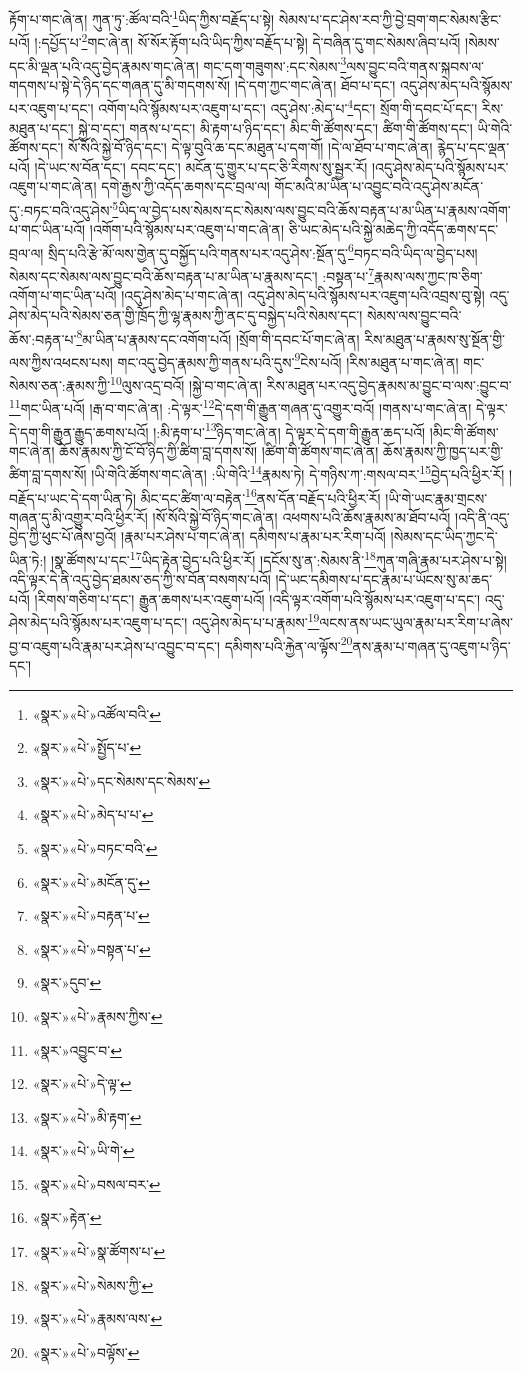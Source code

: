 རྟོག་པ་གང་ཞེ་ན། ཀུན་ཏུ་:ཚོལ་བའི་\footnote{«སྣར་»«པེ་»འཚོལ་བའི་}ཡིད་ཀྱིས་བརྗོད་པ་སྟེ། སེམས་པ་དང་ཤེས་རབ་ཀྱི་བྱེ་བྲག་གང་སེམས་རྩིང་པའོ། །:དཔྱོད་པ་\footnote{«སྣར་»«པེ་»སྤྱོད་པ་}གང་ཞེ་ན། སོ་སོར་རྟོག་པའི་ཡིད་ཀྱིས་བརྗོད་པ་སྟེ། དེ་བཞིན་དུ་གང་སེམས་ཞིབ་པའོ། །སེམས་དང་མི་ལྡན་པའི་འདུ་བྱེད་རྣམས་གང་ཞེ་ན། གང་དག་གཟུགས་:དང་སེམས་\footnote{«སྣར་»«པེ་»དང་སེམས་དང་སེམས་}ལས་བྱུང་བའི་གནས་སྐབས་ལ་གདགས་པ་སྟེ་དེ་ཉིད་དང་གཞན་དུ་མི་གདགས་སོ། །དེ་དག་ཀྱང་གང་ཞེ་ན། ཐོབ་པ་དང་། འདུ་ཤེས་མེད་པའི་སྙོམས་པར་འཇུག་པ་དང་། འགོག་པའི་སྙོམས་པར་འཇུག་པ་དང་། འདུ་ཤེས་:མེད་པ་\footnote{«སྣར་»«པེ་»མེད་པ་པ་}དང་། སྲོག་གི་དབང་པོ་དང་། རིས་མཐུན་པ་དང་། སྐྱེ་བ་དང་། གནས་པ་དང་། མི་རྟག་པ་ཉིད་དང་། མིང་གི་ཚོགས་དང་། ཚིག་གི་ཚོགས་དང་། ཡི་གེའི་ཚོགས་དང་། སོ་སོའི་སྐྱེ་བོ་ཉིད་དང་། དེ་ལྟ་བུའི་ཆ་དང་མཐུན་པ་དག་གོ། །དེ་ལ་ཐོབ་པ་གང་ཞེ་ན། རྙེད་པ་དང་ལྡན་པའོ། །དེ་ཡང་ས་བོན་དང་། དབང་དང་། མངོན་དུ་གྱུར་པ་དང་ཅི་རིགས་སུ་སྦྱར་རོ། །འདུ་ཤེས་མེད་པའི་སྙོམས་པར་འཇུག་པ་གང་ཞེ་ན། དགེ་རྒྱས་ཀྱི་འདོད་ཆགས་དང་བྲལ་ལ། གོང་མའི་མ་ཡིན་པ་འབྱུང་བའི་འདུ་ཤེས་མངོན་དུ་:བཏང་བའི་འདུ་ཤེས་\footnote{«སྣར་»«པེ་»བཏང་བའི་}ཡིད་ལ་བྱེད་པས་སེམས་དང་སེམས་ལས་བྱུང་བའི་ཆོས་བརྟན་པ་མ་ཡིན་པ་རྣམས་འགོག་པ་གང་ཡིན་པའོ། །འགོག་པའི་སྙོམས་པར་འཇུག་པ་གང་ཞེ་ན། ཅི་ཡང་མེད་པའི་སྐྱེ་མཆེད་ཀྱི་འདོད་ཆགས་དང་བྲལ་ལ། སྲིད་པའི་རྩེ་མོ་ལས་གྱེན་དུ་བསྐྱོད་པའི་གནས་པར་འདུ་ཤེས་:སྔོན་དུ་\footnote{«སྣར་»«པེ་»མངོན་དུ་}བཏང་བའི་ཡིད་ལ་བྱེད་པས། སེམས་དང་སེམས་ལས་བྱུང་བའི་ཆོས་བརྟན་པ་མ་ཡིན་པ་རྣམས་དང་། :བསྟན་པ་\footnote{«སྣར་»«པེ་»བརྟན་པ་}རྣམས་ལས་ཀྱང་ཁ་ཅིག་འགོག་པ་གང་ཡིན་པའོ། །འདུ་ཤེས་མེད་པ་གང་ཞེ་ན། འདུ་ཤེས་མེད་པའི་སྙོམས་པར་འཇུག་པའི་འབྲས་བུ་སྟེ། འདུ་ཤེས་མེད་པའི་སེམས་ཅན་གྱི་ཁྲོད་ཀྱི་ལྷ་རྣམས་ཀྱི་ནང་དུ་བསྐྱེད་པའི་སེམས་དང་། སེམས་ལས་བྱུང་བའི་ཆོས་:བརྟན་པ་\footnote{«སྣར་»«པེ་»བསྟན་པ་}མ་ཡིན་པ་རྣམས་དང་འགོག་པའོ། །སྲོག་གི་དབང་པོ་གང་ཞེ་ན། རིས་མཐུན་པ་རྣམས་སུ་སྔོན་གྱི་ལས་ཀྱིས་འཕངས་པས། གང་འདུ་བྱེད་རྣམས་ཀྱི་གནས་པའི་དུས་\footnote{«སྣར་»དུབ་}ངེས་པའོ། །རིས་མཐུན་པ་གང་ཞེ་ན། གང་སེམས་ཅན་:རྣམས་ཀྱི་\footnote{«སྣར་»«པེ་»རྣམས་ཀྱིས་}ལུས་འདྲ་བའོ། །སྐྱེ་བ་གང་ཞེ་ན། རིས་མཐུན་པར་འདུ་བྱེད་རྣམས་མ་བྱུང་བ་ལས་:བྱུང་བ་\footnote{«སྣར་»འབྱུང་བ་}གང་ཡིན་པའོ། །རྒ་བ་གང་ཞེ་ན། :དེ་ལྟར་\footnote{«སྣར་»«པེ་»དེ་ལྟ་}དེ་དག་གི་རྒྱུན་གཞན་དུ་འགྱུར་བའོ། །གནས་པ་གང་ཞེ་ན། དེ་ལྟར་དེ་དག་གི་རྒྱུན་རྒྱུད་ཆགས་པའོ། །:མི་རྟག་པ་\footnote{«སྣར་»«པེ་»མི་རྟག་}ཉིད་གང་ཞེ་ན། དེ་ལྟར་དེ་དག་གི་རྒྱུན་ཆད་པའོ། །མིང་གི་ཚོགས་གང་ཞེ་ན། ཆོས་རྣམས་ཀྱི་ངོ་བོ་ཉིད་ཀྱི་ཚིག་བླ་དགས་སོ། །ཚིག་གི་ཚོགས་གང་ཞེ་ན། ཆོས་རྣམས་ཀྱི་ཁྱད་པར་གྱི་ཚིག་བླ་དགས་སོ། །ཡི་གེའི་ཚོགས་གང་ཞེ་ན། :ཡི་གེའི་\footnote{«སྣར་»«པེ་»ཡི་གེ་}རྣམས་ཏེ། དེ་གཉིས་ཀ་:གསལ་བར་\footnote{«སྣར་»«པེ་»བསལ་བར་}བྱེད་པའི་ཕྱིར་རོ། །བརྗོད་པ་ཡང་དེ་དག་ཡིན་ཏེ། མིང་དང་ཚིག་ལ་བརྟེན་\footnote{«སྣར་»རྟེན་}ནས་དོན་བརྗོད་པའི་ཕྱིར་རོ། །ཡི་གེ་ཡང་རྣམ་གྲངས་གཞན་དུ་མི་འགྱུར་བའི་ཕྱིར་རོ། །སོ་སོའི་སྐྱེ་བོ་ཉིད་གང་ཞེ་ན། འཕགས་པའི་ཆོས་རྣམས་མ་ཐོབ་པའོ། །འདི་ནི་འདུ་བྱེད་ཀྱི་ཕུང་པོ་ཞེས་བྱའོ། །རྣམ་པར་ཤེས་པ་གང་ཞེ་ན། དམིགས་པ་རྣམ་པར་རིག་པའོ། །སེམས་དང་ཡིད་ཀྱང་དེ་ཡིན་ཏེ:། །སྣ་ཚོགས་པ་དང་\footnote{«སྣར་»«པེ་»སྣ་ཚོགས་པ་}ཡིད་རྟེན་བྱེད་པའི་ཕྱིར་རོ། །དངོས་སུ་ན་:སེམས་ནི་\footnote{«སྣར་»«པེ་»སེམས་ཀྱི་}ཀུན་གཞི་རྣམ་པར་ཤེས་པ་སྟེ། འདི་ལྟར་དེ་ནི་འདུ་བྱེད་ཐམས་ཅད་ཀྱི་ས་བོན་བསགས་པའོ། །དེ་ཡང་དམིགས་པ་དང་རྣམ་པ་ཡོངས་སུ་མ་ཆད་པའོ། །རིགས་གཅིག་པ་དང་། རྒྱུན་ཆགས་པར་འཇུག་པའོ། །འདི་ལྟར་འགོག་པའི་སྙོམས་པར་འཇུག་པ་དང་། འདུ་ཤེས་མེད་པའི་སྙོམས་པར་འཇུག་པ་དང་། འདུ་ཤེས་མེད་པ་པ་རྣམས་\footnote{«སྣར་»«པེ་»རྣམས་ལས་}ལངས་ནས་ཡང་ཡུལ་རྣམ་པར་རིག་པ་ཞེས་བྱ་བ་འཇུག་པའི་རྣམ་པར་ཤེས་པ་འབྱུང་བ་དང་། དམིགས་པའི་རྐྱེན་ལ་ལྟོས་\footnote{«སྣར་»«པེ་»བལྟོས་}ནས་རྣམ་པ་གཞན་དུ་འཇུག་པ་ཉིད་དང་། 